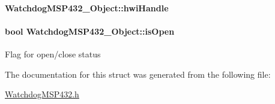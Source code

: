\paragraph[{hwi\+Handle}]{ Watchdog\+M\+S\+P432\+\_\+\+Object\+::hwi\+Handle}\label{struct_watchdog_m_s_p432___object_a2ab0f5242ebff32a5b73f04245f44f94}
\paragraph[{is\+Open}]{\setlength{\rightskip}{0pt plus 5cm}bool Watchdog\+M\+S\+P432\+\_\+\+Object\+::is\+Open}\label{struct_watchdog_m_s_p432___object_a8e1ce4085157c2a708fecb5a6479797f}
Flag for open/close status 

The documentation for this struct was generated from the following file\+:\begin{DoxyCompactItemize}
\item 
\hyperlink{_watchdog_m_s_p432_8h}{Watchdog\+M\+S\+P432.\+h}\end{DoxyCompactItemize}
